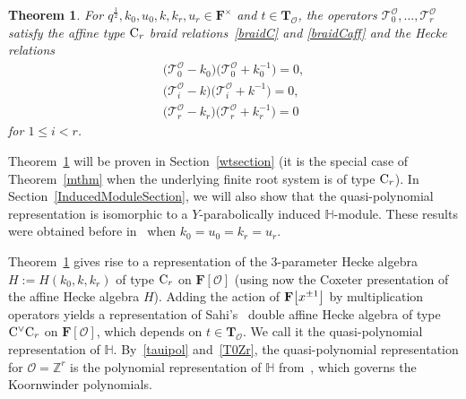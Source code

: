 \documentclass[pdftex]{sigma}
\numberwithin{equation}{section}
\newtheorem{Theorem}{Theorem}[section]
\begin{document}
{\begin{Theorem}\label{TheoremB}
For $q^{\frac{1}{2}},k_0,u_0,k,k_r,u_r\in\mathbf{F}^\times$ and $t\in\mathbf{T}_{\mathcal{O}}$,
the operators $\mathcal{T}_0^{\mathcal{O}},\dots,\mathcal{T}_r^{\mathcal{O}}$
satisfy the affine type ${\rm C}_r$ braid relations~\eqref{braidC} and \eqref{braidCaff} and the Hecke relations
\begin{gather*}
\bigl(\mathcal{T}_0^{\mathcal{O}}-k_0\bigr)\bigl(\mathcal{T}_0^{\mathcal{O}}+k_0^{-1}\bigr)=0,\\
\bigl(\mathcal{T}_i^{\mathcal{O}}-k\bigr)\bigl(\mathcal{T}_i^{\mathcal{O}}+k^{-1}\bigr)=0,\\
\bigl(\mathcal{T}_r^{\mathcal{O}}-k_r\bigr)\bigl(\mathcal{T}_r^{\mathcal{O}}+k_r^{-1}\bigr)=0
\end{gather*}
for $1\leq i<r$.
\end{Theorem}

Theorem~\ref{TheoremB} will be proven in Section~\ref{wtsection} (it is the special case of
Theorem~\ref{mthm} when the underlying finite root system is of type ${\rm C}_r$).
In Section~\ref{InducedModuleSection}, we will also show that the quasi-polynomial representation is isomorphic to a $Y$-parabolically induced $\mathbb{H}$-module. These results were obtained before in~\cite{SSV2} when $k_0=u_0=k_r=u_r$.

Theorem~\ref{TheoremB} gives rise to a representation of the $3$-parameter Hecke algebra $H:=H(k_0,k,k_r)$ of type ${\rm C}_r$ on $\mathbf{F}[\mathcal{O}]$ (using now the Coxeter presentation of the affine Hecke algebra $H$). Adding the action of $\mathbf{F}\smash{\bigl[x^{\pm 1}\bigr]}$ by multiplication operators yields a representation of Sahi's~\cite{Sa} double affine Hecke algebra  of type ${\rm C}^\vee{\rm C}_r$ on $\mathbf{F}[\mathcal{O}]$, which depends on $t\in\mathbf{T}_\mathcal{O}$. We call it the quasi-polynomial representation of $\mathbb{H}$. By~\eqref{tauipol} and~\eqref{T0Zr}, the quasi-polynomial representation for $\mathcal{O}=\mathbb{Z}^r$ is the polynomial representation of $\mathbb{H}$ from~\cite{No,Sa}, which governs the Koornwinder polynomials.

}
\end{document}
